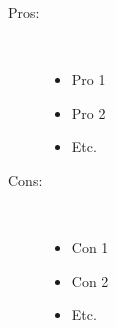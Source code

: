 \documentclass[10pt,a4paper]{article}
\begin{document}
\begin{description}
	\item[Pros:]\ 
		\begin{itemize}
			\item Pro 1
			\item Pro 2
			\item Etc.
		\end{itemize}

	\item[Cons:]\ 
		\begin{itemize}
			\item Con 1
			\item Con 2
			\item Etc.
		\end{itemize}
\end{description}
\end{document}
